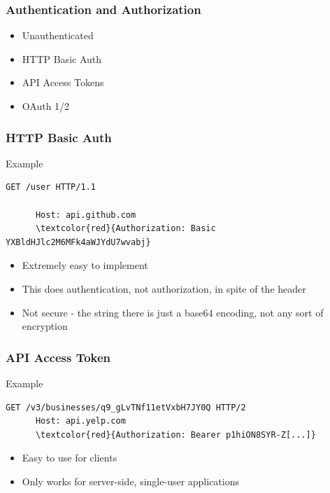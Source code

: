 \documentclass[dvipsnames]{beamer}
\begin{document}
\begin{frame}
  \frametitle{Authentication and Authorization}
  \begin{itemize}
    \item Unauthenticated
    \item HTTP Basic Auth
    \item API Access Tokens
    \item OAuth 1/2
  \end{itemize}
\end{frame}


\begin{frame}[fragile=singleslide]
  \frametitle{HTTP Basic Auth}
  \begin{block}{Example}
    \begin{Verbatim}[commandchars=\\\{\}]
      GET /user HTTP/1.1
      
      Host: api.github.com
      \textcolor{red}{Authorization: Basic YXBldHJlc2M6MFk4aWJYdU7wvabj}
    \end{Verbatim}
  \end{block}

    \begin{itemize}
      \item Extremely easy to implement
      \item This does authentication, not authorization, in spite of the header
      \item Not secure - the string there is just a base64 encoding, not any sort of encryption
    \end{itemize}
\end{frame}


\begin{frame}[fragile=singleslide]
  \frametitle{API Access Token}
  \begin{block}{Example}
    \begin{Verbatim}[commandchars=\\\{\}]
      GET /v3/businesses/q9_gLvTNf11etVxbH7JY0Q HTTP/2
      Host: api.yelp.com
      \textcolor{red}{Authorization: Bearer p1hiON8SYR-Z[...]}
    \end{Verbatim}
  \end{block}
  
  \begin{itemize}
    \item Easy to use for clients
    \item Only works for server-side, single-user applications
  \end{itemize}
\end{frame}
\end{document}
